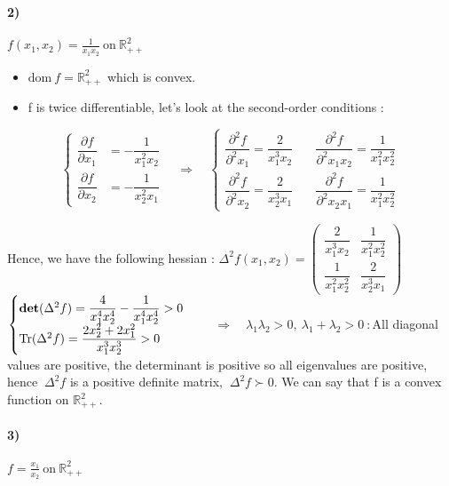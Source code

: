\documentclass[12pt,a4paper]{article}
\begin{document}
\paragraph{2)} $ f(x_1,x_2)=\frac{1}{x_1x_2} ~\text{on}~ \mathbb{R}_{++}^2$

\begin{itemize}
	\item $ \text{dom} ~f=\mathbb{R}^2_{++} $ which is convex.
	\item f is twice differentiable, let's look at the second-order conditions :\\
 \end{itemize}
 \begin{center} 
$$	\begin{cases}
	\dfrac{\partial f}{\partial x_1} &= -\dfrac{1}{x_1^2x_2} \\
	\dfrac{\partial f}{\partial x_2} &= -\dfrac{1}{x_2^2x_1}
		\end{cases}
		\quad 
		\Rightarrow
		\quad
		\left\lbrace
		\begin{matrix}
			\dfrac{\partial^2 f}{\partial^2 x_1} =  \dfrac{2}{x_1^3x_2} \quad 
			&\dfrac{\partial^2 f}{\partial^2 x_1x_2} =  \dfrac{1}{x_1^2x_2^2} \\
			\dfrac{\partial^2 f}{\partial^2 x_2} =  \dfrac{2}{x_2^3x_1} \quad 
			&\dfrac{\partial^2 f}{\partial^2 x_2x_1} =  \dfrac{1}{x_1^2x_2^2}
		\end{matrix} \right.	$$
	\end{center}
	Hence, we have the following hessian : \def\arraystretch{2} $ \Delta^2 f(x_1,x_2)=	\begin{pmatrix}
		\dfrac{2}{x_1^3x_2} & \dfrac{1}{x_1^2x_2^2} \\
		\dfrac{1}{x_1^2x_2^2} & \dfrac{2}{x_2^3x_1}
        \end{pmatrix} $\\
        
        $
	\begin{cases}
		\text{\textbf{det}}(\Delta^2f)= \dfrac{4}{x_1^4x_2^4}-\dfrac{1}{x_1^4x_2^4} > 0\\
		\text{Tr}(\Delta^2f)=\dfrac{2x_2^2+2x_1^2}{x_1^3x_2^3}>0
	\end{cases}
$
		$\quad \Rightarrow \quad \lambda_1\lambda_2>0,~\lambda_1+\lambda_2>0~: $All diagonal values are positive,  the determinant is positive so all eigenvalues are positive, hence $~\Delta^2f$ is a positive definite matrix, $~\Delta^2f \succ 0$.
		We can say that f is a convex function on $ \mathbb{R}^2_{++}. $	
		\paragraph{3)} $ f=\frac{x_1}{x_2} ~\text{on} ~\mathbb{R}^2_{++} $
\end{document}
